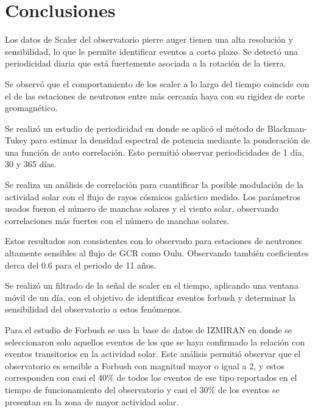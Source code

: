 \newpage
\chapter{Conclusiones}

Los datos de Scaler del observatorio pierre auger tienen una alta resolución y sensibilidad, lo que le permite identificar eventos a corto plazo. Se detectó una periodicidad diaria que está fuertemente asociada a la rotación de la tierra.

Se observó que el comportamiento de los scaler a lo largo del tiempo coincide con el de las estaciones de neutrones entre más cercanía haya con su rigidez de corte geomagnético.

Se realizó un estudio de periodicidad en donde se aplicó el método de Blackman-Tukey para estimar la densidad espectral de potencia mediante la ponderación de una función de auto correlación. Esto permitió observar periodicidades de 1 día, 30 y 365 días.

Se realiza un análisis de correlación para cuantificar la posible modulación de la actividad solar con el flujo de rayos cósmicos galáctico medido. Los parámetros usados fueron el número de manchas solares y el viento solar, observando correlaciones más fuertes con el número de manchas solares. 

Estos resultados son consistentes con lo observado para estaciones de neutrones altamente sensibles al flujo de GCR como Oulu. Observando también coeficientes derca del 0.6 para el periodo de 11 años.

Se realizó un filtrado de la señal de scaler en el tiempo, aplicando una ventana móvil de un día, con el objetivo de identificar eventos forbush y determinar la sensibilidad del observatorio a estos fenómenos.

Para el estudio de Forbush se usa la base de datos de IZMIRAN en donde se seleccionaron solo aquellos eventos de los que se haya confirmado la relación con eventos transitorios en la actividad solar. Este análisis permitió observar que el observatorio es sensible a Forbush con magnitud mayor o igual a 2, y estos corresponden con casi el $40\%$ de todos los eventos de ese tipo reportados en el tiempo de funcionamiento del observatorio y casi el $30\%$ de los eventos se presentan en la zona de mayor actividad solar. 

